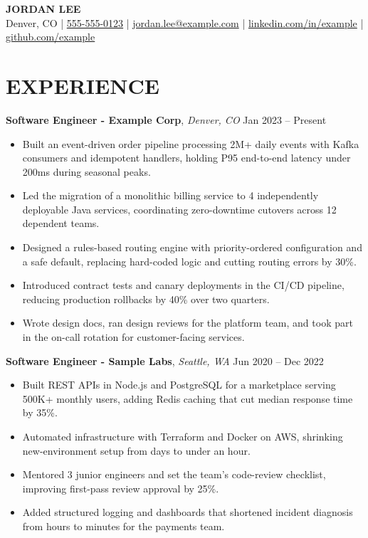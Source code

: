 \documentclass[10pt, letterpaper]{article}
\begin{document}
\begin{center}
    \textbf{\Large JORDAN LEE} \\
    Denver, CO | \href{tel:+15555550123}{555-555-0123} | \href{mailto:jordan.lee@example.com}{jordan.lee@example.com} | \href{https://linkedin.com/in/example}{linkedin.com/in/example} | \href{https://github.com/example}{github.com/example}
\end{center}
\vspace{-1em}


\section*{EXPERIENCE}

\textbf{Software Engineer - Example Corp}, \textit{Denver, CO} \hfill Jan 2023 -- Present
\vspace{-0.6em}
\begin{itemize}[leftmargin=2em, itemsep=0pt, parsep=0pt]
    \item Built an event-driven order pipeline processing 2M+ daily events with Kafka consumers and idempotent handlers, holding P95 end-to-end latency under 200ms during seasonal peaks.
    \item Led the migration of a monolithic billing service to 4 independently deployable Java services, coordinating zero-downtime cutovers across 12 dependent teams.
    \item Designed a rules-based routing engine with priority-ordered configuration and a safe default, replacing hard-coded logic and cutting routing errors by 30\%.
    \item Introduced contract tests and canary deployments in the CI/CD pipeline, reducing production rollbacks by 40\% over two quarters.
    \item Wrote design docs, ran design reviews for the platform team, and took part in the on-call rotation for customer-facing services.
\end{itemize}
\vspace{-0.2em}

\textbf{Software Engineer - Sample Labs}, \textit{Seattle, WA} \hfill Jun 2020 -- Dec 2022
\vspace{-0.6em}
\begin{itemize}[leftmargin=2em, itemsep=0pt, parsep=0pt]
    \item Built REST APIs in Node.js and PostgreSQL for a marketplace serving 500K+ monthly users, adding Redis caching that cut median response time by 35\%.
    \item Automated infrastructure with Terraform and Docker on AWS, shrinking new-environment setup from days to under an hour.
    \item Mentored 3 junior engineers and set the team's code-review checklist, improving first-pass review approval by 25\%.
    \item Added structured logging and dashboards that shortened incident diagnosis from hours to minutes for the payments team.
\end{itemize}
\vspace{-0.2em}
\end{document}
